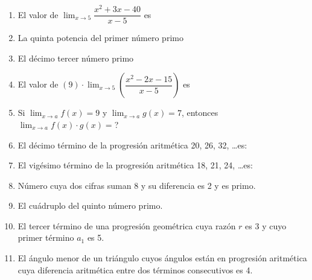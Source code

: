 \documentclass[letterpaper,11pt,twoside]{article}
\begin{document}
\begin{multicols}{2}
\begin{enumerate}
\item El valor de $\displaystyle{\lim_{x\rightarrow 5}}\dfrac{x^{2}+3x-40}{x-5}$ es
\item La quinta potencia del primer número primo
\item El décimo tercer número primo
\item El valor de \quad $\displaystyle{(9)\cdot\lim_{x\rightarrow 5}
\left(\dfrac{x^{2}-2x-15}{x-5}\right)}$ es
\item Si $\displaystyle{\lim_{x\rightarrow a}f(x)}=9$ y $\displaystyle{\lim_{x\rightarrow a}g(x)}=7$, entonces $\displaystyle{\lim_{x\rightarrow a}f(x)\cdot g(x)}=$?
\item El décimo término de la progresión aritmética 20, 26, 32, \ldots es:
\item El vigésimo término de la progresión aritmética 18, 21, 24, \ldots es:
\item Número cuya dos cifras suman 8 y su diferencia es 2 y es primo.
\item El cuádruplo del quinto número primo.
\item El tercer término de una progresión geométrica cuya razón $r$ es 3 y cuyo primer término $a_{1}$ es 5.
\item El ángulo menor de un triángulo cuyos ángulos están en progresión aritmética cuya diferencia aritmética entre dos términos consecutivos es 4.


\end{enumerate}
\end{multicols}
\end{document}
